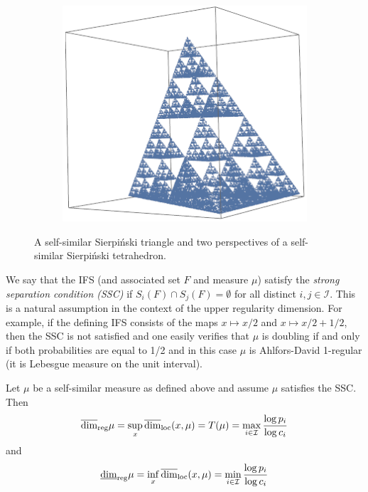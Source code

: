 \begin{figure}[h]
	\begin{subfigure}{.3\textwidth}
		\centering
		\includegraphics[width=.9\linewidth]{pics/ch-upper-reg/sierptetra2.png}
	\end{subfigure}
	\caption{A self-similar Sierpi\'nski triangle and two perspectives of a self-similar Sierpi\'nski tetrahedron.}
	\label{ch-upper-reg:fig:test}
\end{figure}

We say that the IFS (and associated set $F$ and measure $\mu$) satisfy the \emph{strong separation condition (SSC)} if $S_i(F) \cap S_j(F) = \emptyset$ for all distinct $i,j \in \mathcal{I}$.  This is a natural assumption in the context of the upper regularity dimension.  For example, if the defining IFS consists of the maps $x \mapsto x/2$ and $x \mapsto x/2+1/2$, then the SSC is not satisfied and one easily verifies that $\mu$ is doubling if and only if both probabilities are equal to 1/2 and in this case $\mu$ is Ahlfors-David 1-regular (it is Lebesgue measure on the unit interval). 



\begin{theorem}\label{ch-upper-reg:selfsimilar}
	Let $\mu$ be a self-similar measure as defined above and assume $\mu$ satisfies the SSC.  Then 
	\[
	\overline{\dim}_{\textup{reg}} \mu = \sup_x \overline{\dim}_{\textup{loc}}(x,\mu) = T(\mu) = \max_{i \in \mathcal{I}} \frac{\log p_i}{\log c_i}
	\]
	and 
	\[
	\underline{\dim}_{\textup{reg}} \mu = \inf_x \overline{\dim}_{\textup{loc}}(x,\mu) = \min_{i \in \mathcal{I}} \frac{\log p_i}{\log c_i}
	\]
\end{theorem}


